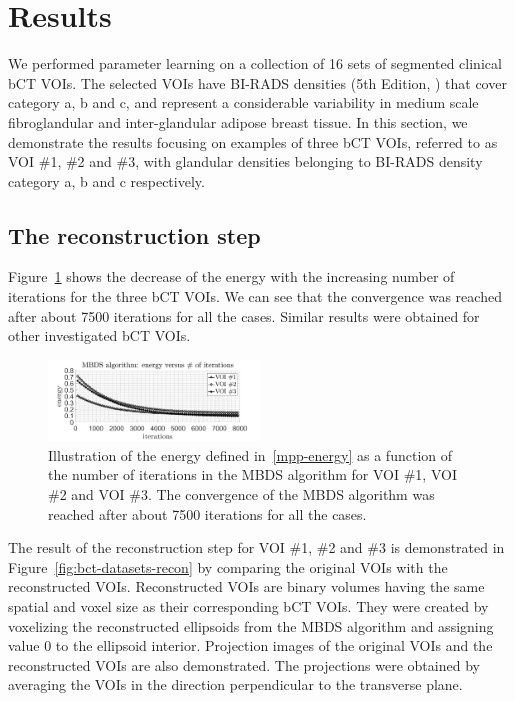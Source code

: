 \documentclass[journal]{IEEEtran}
\begin{document}
\section{Results}
\label{sec:results}

We performed parameter learning on a collection of 16 sets of
segmented clinical bCT VOIs. The selected VOIs have BI-RADS densities
(5th Edition, \cite{d2013acr}) that cover category a, b and c, and
represent a considerable variability in medium scale fibroglandular
and inter-glandular adipose breast tissue. In this section, we
demonstrate the results focusing on examples of three bCT VOIs,
referred to as VOI \#1, \#2 and \#3, with glandular densities
belonging to BI-RADS density category a, b and c respectively.

\subsection{The reconstruction step}
\label{sec:reconstruction-step}

Figure~\ref{fig:conv-mbds} shows the decrease of the energy with the
increasing number of iterations for the three bCT VOIs. We can see
that the convergence was reached after about 7500 iterations for all
the cases. Similar results were obtained for other investigated bCT
VOIs.

\begin{figure}[!htb]
  \centering
  \includegraphics[width=0.5\textwidth]
  {figure/convergence_mbds}
  \caption{Illustration of the energy defined in~\eqref{mpp-energy} as
    a function of the number of iterations in the MBDS algorithm for
    VOI \#1, VOI \#2 and VOI \#3. The convergence of the MBDS
    algorithm was reached after about 7500 iterations for all the
    cases.}
  \label{fig:conv-mbds}
\end{figure}

The result of the reconstruction step for VOI \#1, \#2 and \#3 is
demonstrated in Figure~\ref{fig:bct-datasets-recon} by comparing the
original VOIs with the reconstructed VOIs. Reconstructed VOIs are
binary volumes having the same spatial and voxel size as their
corresponding bCT VOIs. They were created by voxelizing the
reconstructed ellipsoids from the MBDS algorithm and assigning value 0
to the ellipsoid interior. Projection images of the original VOIs and
the reconstructed VOIs are also demonstrated. The projections were
obtained by averaging the VOIs in the direction perpendicular to the
transverse plane.
\end{document}

